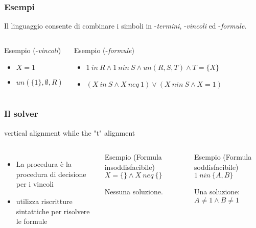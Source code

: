\documentclass{beamer}
\begin{document}

\begin{frame}
  \frametitle{Esempi} Il linguaggio \lset{} consente di combinare i
  simboli in \lset{}-\textit{termini}, \lset{}-\textit{vincoli} ed
  \lset{}-\textit{formule}.
  \begin{columns}[c]
    \begin{exampleblock}{Esempio (\lset{}-\textit{vincoli})}
      \begin{itemize}
      \item $X = 1$
      \item $un(\{1\}, \emptyset, R)$
      \end{itemize}
    \end{exampleblock}
    \begin{exampleblock}{Esempio (\lset{}-\textit{formule})}
      \begin{itemize}
      \item $1\ in\ R \land 1\ nin\ S \land un(R,S,T) \land T = \{X\}$
      \item $(X\ in\ S \land X\ neq\ 1) \lor (X\ nin\ S \land X = 1)$
      \end{itemize}
    \end{exampleblock}
  \end{columns}
\end{frame}


\begin{frame}
  \frametitle{Il solver \satset{}} %
  vertical alignment while the "t" %
  alignment
  \begin{columns}[c]

    \begin{itemize}
    \item La procedura \satset{} è la procedura di decisione per i
      vincoli
    \item \satset{} utilizza riscritture sintattiche per risolvere le
      formule
    \end{itemize}

    \begin{exampleblock}{Esempio (Formula insoddisfacibile)}
      $X = \{\} \land X\ neq\ \{\}$
      
      Nessuna soluzione.
    \end{exampleblock}
    \begin{exampleblock}{Esempio (Formula soddisfacibile)}
      $1\ nin\ \{A, B\}$
      
      Una soluzione: $A \neq 1 \land B \neq 1$
    \end{exampleblock}
  \end{columns}
\end{frame}
\end{document}
